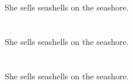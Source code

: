 She sells seashells on the seashore.

\section{\introductiontitle}

She sells seashells on the seashore.

\section{\conclusiontitle}

She sells seashells on the seashore.
